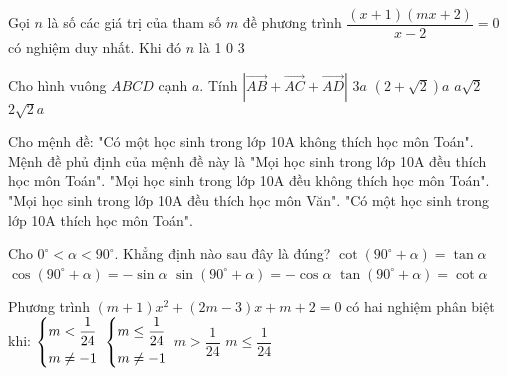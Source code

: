 \begin{ex}%
Gọi $n$ là số các giá trị của tham số $m$ đề phương trình $\dfrac{(x+1)(mx+2)}{x-2}=0$ có nghiệm duy nhất. Khi đó $n$ là
\choice
{}
{1}
{0}
{3}
\end{ex}
\begin{ex}%
Cho hình vuông $ABCD$ cạnh $a$. Tính $|\vec{AB}+\vec{AC}+\vec{AD}|$
\choice
{$3a$}
{$(2+\sqrt{2})a$}
{$a\sqrt{2}$}
{\True $2\sqrt{2}a$}
\end{ex}
\begin{ex}%
Cho mệnh đề: "Có một học sinh trong lớp 10A không thích học môn Toán". Mệnh đề phủ định của mệnh đề này là
\choice
{\True "Mọi học sinh trong lớp 10A đều thích học môn Toán".}
{"Mọi học sinh trong lớp 10A đều không thích học môn Toán".}
{"Mọi học sinh trong lớp 10A đều thích học môn Văn".}
{"Có một học sinh trong lớp 10A thích học môn Toán". }
\loigiai{
}
\end{ex}
\begin{ex}%
Cho $0^\circ < \alpha <90^\circ$. Khẳng định nào sau đây là đúng?
\choice
{$\cot (90^\circ +\alpha)=\tan \alpha$}
{\True $\cos (90^\circ +\alpha)=-\sin \alpha$}
{$\sin (90^\circ +\alpha)=-\cos \alpha$}
{$\tan (90^\circ +\alpha)=\cot \alpha$}
\end{ex}
\begin{ex}%
Phương trình $(m+1)x^2+(2m-3)x+m+2=0$ có hai nghiệm phân biệt khi:
\choice
{\True $\left\{\begin{aligned}&m<\dfrac{1}{24}\\&m\ne -1\end{aligned}\right.$}
{$\left\{\begin{aligned}&m\le \dfrac{1}{24}\\&m\ne -1\end{aligned}\right.$}
{$m>\dfrac{1}{24}$}
{$m\le \dfrac{1}{24}$}
\end{ex}
